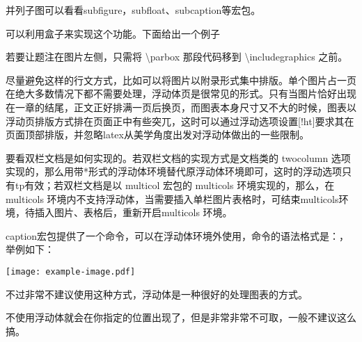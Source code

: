 
并列子图可以看看subfigure，subfloat、subcaption等宏包。



可以利用盒子来实现这个功能。下面给出一个例子


若要让题注在图片左侧，只需将 \textbackslash{}parbox 那段代码移到
\textbackslash{}includegraphics 之前。



尽量避免这样的行文方式，比如可以将图片以附录形式集中排版。单个图片占一页在绝大多数情况下都不需要处理，浮动体页是很常见的形式。只有当图片恰好出现在一章的结尾，正文正好排满一页后换页，而图表本身尺寸又不大的时候，图表以浮动页排版方式排在页面正中有些突兀，这时可以通过浮动选项设置{[}!ht{]}要求其在页面顶部排版，并忽略latex从美学角度出发对浮动体做出的一些限制。



要看双栏文档是如何实现的。若双栏文档的实现方式是文档类的 twocolumn
选项实现的，那么用带*形式的浮动体环境替代原浮动体环境即可，这时的浮动选项只有tp有效；若双栏文档是以
multicol 宏包的 multicols 环境实现的，那么，在 multicols
环境内不支持浮动体，当需要插入单栏图片表格时，可结束multicols环境，待插入图片、表格后，重新开启multicols
环境。



caption宏包提供了一个命令，可以在浮动体环境外使用，命令的语法格式是：，举例如下：

\begin{texinlist}
\begin{center}
\texttt{[image: example-image.pdf]}
\end{center}
\end{texinlist}

不过非常不建议使用这种方式，浮动体是一种很好的处理图表的方式。



不使用浮动体就会在你指定的位置出现了，但是非常非常不可取，一般不建议这么搞。





